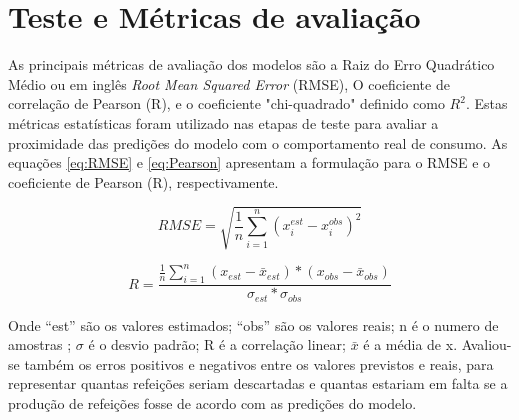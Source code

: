     \section{Teste e Métricas de avaliação}
       As principais métricas de avaliação dos modelos são a Raiz do Erro Quadrático Médio ou em inglês \textit{Root Mean Squared Error} (RMSE), O coeficiente de correlação de Pearson (R), e o coeficiente "chi-quadrado" definido como $R^2$. Estas métricas estatísticas foram utilizado nas etapas de teste para avaliar a proximidade das predições do modelo com o comportamento real de consumo. As equações \ref{eq:RMSE} e \ref{eq:Pearson} apresentam a formulação para o RMSE e o coeficiente de Pearson (R), respectivamente.
       
       \begin{equation}
           RMSE = \sqrt{\frac{1}{n}  \sum_{i=1}^n (x_i^{est} - x_i^{obs})^2}
           \label{eq:RMSE}
       \end{equation}
       
       \begin{equation}
           R = \frac{\frac{1}{n}  \sum_{i=1}^n (x_{est} - \bar{x}_{est}) * (x_{obs} - \bar{x}_{obs})}{\sigma_{est} * \sigma_{obs} }
           \label{eq:Pearson}
       \end{equation}
       
       Onde “est” são os valores estimados; “obs” são os valores reais; n é o numero de amostras ; $\sigma$ é o desvio padrão; R é a correlação linear; $\bar{x}$ é a média de x. Avaliou-se também os erros positivos e negativos entre os valores previstos e reais, para representar quantas refeições seriam descartadas e quantas estariam em falta se a produção de refeições fosse de acordo com as predições do modelo.
       
